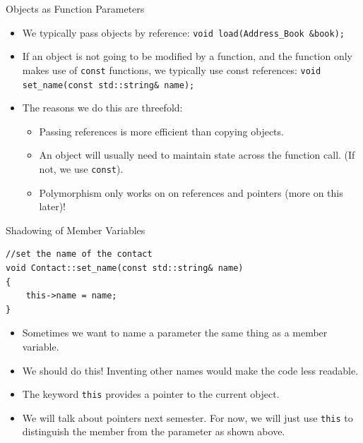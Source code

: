 \documentclass[]{beamer}
\begin{document}
\begin{frame}[fragile]{Objects as Function Parameters}
    \begin{itemize}[<+(1)->]
        \item We typically pass objects by reference:
            \newline\verb!void load(Address_Book &book);!
        \item If an object is not going to be modified by a function,
            and the function only makes use of \texttt{const}
            functions, we typically use const references:
            \newline\verb!void set_name(const std::string& name);!
        \item The reasons we do this are threefold:
        \begin{itemize}
            \item Passing references is more efficient than copying objects.
            \item An object will usually need to maintain state across
                the function call. (If not, we use \texttt{const}).
            \item Polymorphism only works on on references and
                pointers (more on this later)!
        \end{itemize}
    \end{itemize}
\end{frame}

\begin{frame}[fragile]{Shadowing of Member Variables}
    \begin{BVerbatim}
//set the name of the contact
void Contact::set_name(const std::string& name)
{
    this->name = name;
}
    \end{BVerbatim}

    \begin{itemize}[<+(1)->]
    \item Sometimes we want to name a parameter the same thing as
        a member variable.
    \item We should do this!  Inventing other names would make the
        code less readable.
    \item The keyword \texttt{this} provides a pointer to the current
        object.
    \item We will talk about pointers next semester.  For now, we will
        just use \texttt{this} to distinguish the member from the
        parameter as shown above.
    \end{itemize}
\end{frame}
\end{document}
